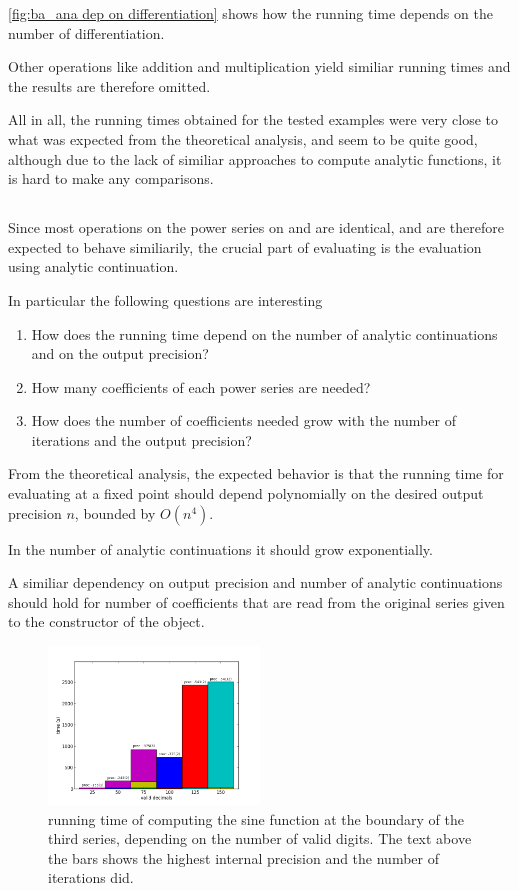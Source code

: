       \ref{fig:ba_ana dep on differentiation} shows how the running time
      depends on the number of differentiation. 

      Other operations like addition and multiplication yield similiar running times and the results are therefore omitted.

      All in all, the running times obtained for the tested examples were very close to what was expected from the theoretical analysis, and seem to
      be quite good, although due to the lack of similiar approaches to compute analytic functions, it is hard to make any comparisons.

      \subsection{\anarect}
			Since most operations on the power series on \anarect and \baana are identical‚ and are therefore expected to behave similiarily, 
			the crucial part of evaluating \baana is the evaluation using analytic continuation.
			
			In particular the following questions are interesting
			\begin{enumerate}
				\item How does the running time depend on the number of analytic continuations and on the output precision?
				\item How many coefficients of each power series are needed?
				\item How does the number of coefficients needed grow with the number of iterations and the output precision?
			\end{enumerate} 

		From the theoretical analysis, the expected behavior is that the running time for evaluating at a fixed 
		point should depend polynomially on the desired output precision $n$, bounded by $O(n^4)$.

    In the number of analytic continuations it should grow exponentially.
    
    A similiar dependency on output precision and number of analytic continuations should hold for number of coefficients that are read 
    from the original series given to the constructor of the \anarect object.


		\begin{figure}[h]
			\centering
			\includegraphics[width=0.5\textwidth]{img/analytic/sin_for_series_4_dep_on_n.png}
			\caption{running time of \anarect computing the sine function at the boundary of the third series, depending on the number of valid digits. The text above the bars shows the highest internal precision and the number of iterations \irram did.}
			\label{fig:sin dep on n}
		\end{figure}

